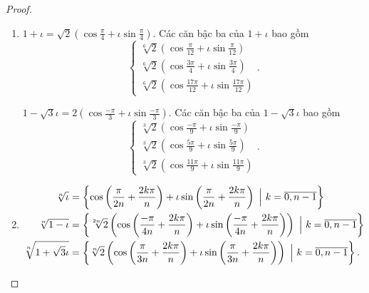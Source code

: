 \begin{proof}
    \begin{enumerate}[label = (\alph*)]
        \item $1 + \iota = \sqrt{2}\left(\cos\frac{\pi}{4} + \iota\sin\frac{\pi}{4}\right)$. Các căn bậc ba của $1 + \iota$ bao gồm
              \[
                  \begin{cases}
                      \sqrt[6]{2}\left(\cos\frac{\pi}{12} + \iota\sin\frac{\pi}{12}\right) \\
                      \sqrt[6]{2}\left(\cos\frac{3\pi}{4} + \iota\sin\frac{3\pi}{4}\right) \\
                      \sqrt[6]{2}\left(\cos\frac{17\pi}{12} + \iota\sin\frac{17\pi}{12}\right)
                  \end{cases}.
              \]
              
              $1 - \sqrt{3}\iota = 2\left(\cos\frac{-\pi}{3} + \iota\sin\frac{-\pi}{3}\right)$. Các căn bậc ba của $1 - \sqrt{3}\iota$ bao gồm
              \[
                  \begin{cases}
                      \sqrt[3]{2}\left(\cos\frac{-\pi}{9} + \iota\sin\frac{-\pi}{9}\right) \\
                      \sqrt[3]{2}\left(\cos\frac{5\pi}{9} + \iota\sin\frac{5\pi}{9}\right) \\
                      \sqrt[3]{2}\left(\cos\frac{11\pi}{9} + \iota\sin\frac{11\pi}{9}\right)
                  \end{cases}.
              \]
        \item \begin{align*}
                  \sqrt[n]{\iota}             & = \left\{ \cos\left(\frac{\pi}{2n} + \frac{2k\pi}{n}\right) + \iota\sin\left(\frac{\pi}{2n} + \frac{2k\pi}{n}\right)\ \Big{|} \ k = \overline{0, n-1} \right\}                            \\
                  \sqrt[n]{1-\iota}           & = \left\{ \sqrt[2n]{2}\left(\cos\left(\frac{-\pi}{4n} + \frac{2k\pi}{n}\right) + \iota\sin\left(\frac{-\pi}{4n} + \frac{2k\pi}{n}\right)\right)\ \Big{|} \ k = \overline{0, n-1} \right\} \\
                  \sqrt[n]{1 + \sqrt{3}\iota} & = \left\{ \sqrt[n]{2}\left(\cos\left(\frac{\pi}{3n} + \frac{2k\pi}{n}\right) + \iota\sin\left(\frac{\pi}{3n} + \frac{2k\pi}{n}\right)\right)\ \Big{|}\ k = \overline{0, n-1} \right\}.
              \end{align*}
    \end{enumerate}
\end{proof}

